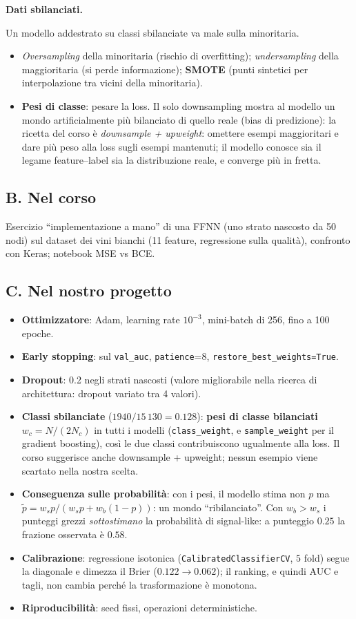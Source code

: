 \documentclass[11pt,a4paper]{article}
\newcommand{\code}[1]{\texttt{#1}}
\newcommand{\dom}[1]{\par\smallskip\noindent\textbf{#1}\par\nopagebreak}
\begin{document}
\dom{Dati sbilanciati.} Un modello addestrato su classi sbilanciate va male sulla minoritaria.
\begin{itemize}
\item \emph{Oversampling} della minoritaria (rischio di overfitting); \emph{undersampling} della maggioritaria (si perde informazione); \textbf{SMOTE} (punti sintetici per interpolazione tra vicini della minoritaria).
\item \textbf{Pesi di classe}: pesare la loss. Il solo downsampling mostra al modello un mondo artificialmente pi\`u bilanciato di quello reale (bias di predizione): la ricetta del corso \`e \emph{downsample + upweight}: omettere esempi maggioritari e dare pi\`u peso alla loss sugli esempi mantenuti; il modello conosce sia il legame feature--label sia la distribuzione reale, e converge pi\`u in fretta.
\end{itemize}

\subsection*{B. Nel corso}
Esercizio ``implementazione a mano'' di una FFNN (uno strato nascosto da 50 nodi) sul dataset dei vini bianchi (11 feature, regressione sulla qualit\`a), confronto con Keras; notebook MSE vs BCE.

\subsection*{C. Nel nostro progetto}
\begin{itemize}
\item \textbf{Ottimizzatore}: Adam, learning rate $10^{-3}$, mini-batch di 256, fino a 100 epoche.
\item \textbf{Early stopping}: sul \code{val\_auc}, \code{patience}=8, \code{restore\_best\_weights=True}.
\item \textbf{Dropout}: 0.2 negli strati nascosti (valore migliorabile nella ricerca di architettura: dropout variato tra 4 valori).
\item \textbf{Classi sbilanciate} ($1940/15\,130=0.128$): \textbf{pesi di classe bilanciati} $w_c=N/(2N_c)$ in tutti i modelli (\code{class\_weight}, e \code{sample\_weight} per il gradient boosting), cos\`i le due classi contribuiscono ugualmente alla loss. Il corso suggerisce anche downsample + upweight; nessun esempio viene scartato nella nostra scelta.
\item \textbf{Conseguenza sulle probabilit\`a}: con i pesi, il modello stima non $p$ ma $\tilde p=w_sp/(w_sp+w_b(1-p))$: un mondo ``ribilanciato''. Con $w_b>w_s$ i punteggi grezzi \emph{sottostimano} la probabilit\`a di signal-like: a punteggio $0.25$ la frazione osservata \`e $0.58$.
\item \textbf{Calibrazione}: regressione isotonica (\code{CalibratedClassifierCV}, $5$ fold) segue la diagonale e dimezza il Brier ($0.122\to0.062$); il ranking, e quindi AUC e tagli, non cambia perch\'e la trasformazione \`e monotona.
\item \textbf{Riproducibilit\`a}: seed fissi, operazioni deterministiche.
\end{itemize}
\end{document}
